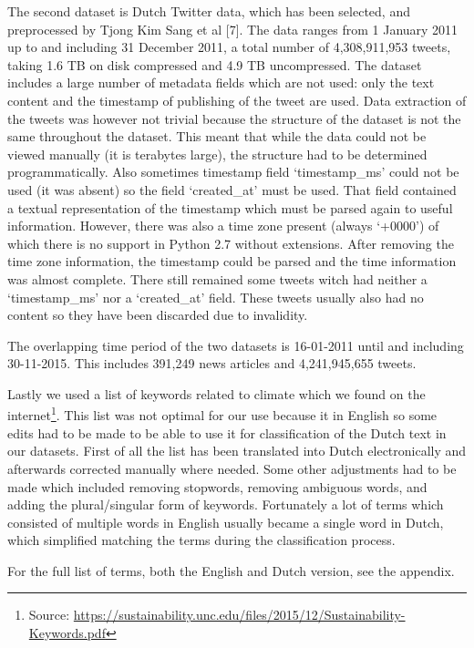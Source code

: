 \documentclass[paper=a4, fontsize=9px]{scrartcl} %
\numberwithin{equation}{section} %
\numberwithin{figure}{section} %
\numberwithin{table}{section} %
\begin{document}
\begin{multicols}{2}
The second dataset is Dutch Twitter data, which has been selected, and preprocessed by Tjong Kim Sang et al [7]. The data ranges from 1 January 2011 up to and including 31 December 2011, a total number of 4,308,911,953 tweets, taking 1.6 TB on disk compressed and 4.9 TB uncompressed. The dataset includes a large number of metadata fields which are not used: only the text content and the timestamp of publishing of the tweet are used. Data extraction of the tweets was however not trivial because the structure of the dataset is not the same throughout the dataset. This meant that while the data could not be viewed manually (it is terabytes large), the structure had to be determined programmatically. Also sometimes timestamp field `timestamp\_ms’ could not be used (it was absent) so the field `created\_at’ must be used. That field contained a textual representation of the timestamp which must be parsed again to useful information. However, there was also a time zone present (always `+0000’) of which there is no support in Python 2.7 without extensions. After removing the time zone information, the timestamp could be parsed and the time information was almost complete. There still remained some tweets witch had neither a `timestamp\_ms’ nor a `created\_at’ field. These tweets usually also had no content so they have been discarded due to invalidity. 

The overlapping time period of the two datasets is 16-01-2011 until and including 30-11-2015. This includes 391,249 news articles and 4,241,945,655 tweets.

Lastly we used a list of keywords related to climate which we found on the internet\footnote{Source: \url{https://sustainability.unc.edu/files/2015/12/Sustainability-Keywords.pdf}}. This list was not optimal for our use because it in English so some edits had to be made to be able to use it for classification of the Dutch text in our datasets. First of all the list has been translated into Dutch electronically and afterwards corrected manually where needed. Some other adjustments had to be made which included removing stopwords, removing ambiguous words, and adding the plural/singular form of keywords. Fortunately a lot of terms which consisted of multiple words in English usually became a single word in Dutch, which simplified matching the terms during the classification process. 

For the full list of terms, both the English and Dutch version, see the appendix.


\end{multicols}
\end{document}
